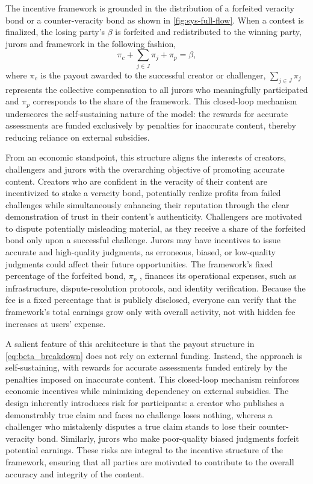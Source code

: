 \documentclass{article}
\begin{document}
The incentive framework is grounded in the distribution of a forfeited veracity bond or a counter-veracity bond as shown in \autoref{fig:sys-full-flow}. When a contest is finalized, the losing party's $\beta$ is forfeited and redistributed to the winning party, jurors and framework in the following fashion,
\begin{equation}
    \pi_c + \sum_{j \in J} \pi_j + \pi_p = \beta,
    \label{eq:beta_breakdown}
\end{equation}
where $\pi_c$ is the payout awarded to the successful creator or challenger, $\sum_{j \in J} \pi_j$ represents the collective compensation to all jurors who meaningfully participated and $\pi_p$ corresponds to the share of the framework. This closed-loop mechanism underscores the self-sustaining nature of the model: the rewards for accurate assessments are funded exclusively by penalties for inaccurate content, thereby reducing reliance on external subsidies.

From an economic standpoint, this structure aligns the interests of creators, challengers and jurors with the overarching objective of promoting accurate content. Creators who are confident in the veracity of their content are incentivized to stake a veracity bond, potentially realize profits from failed challenges while simultaneously enhancing their reputation through the clear demonstration of trust in their content’s authenticity. Challengers are motivated to dispute potentially misleading material, as they receive a share of the forfeited bond only upon a successful challenge. Jurors may have incentives to issue accurate and high-quality judgments, as erroneous, biased, or low-quality judgments could affect their future opportunities. The framework's fixed percentage of the forfeited bond, $\pi_p$ , finances its operational expenses, such as infrastructure, dispute-resolution protocols, and identity verification. Because the fee is a fixed percentage that is publicly disclosed, everyone can verify that the framework’s total earnings grow only with overall activity, not with hidden fee increases at users’ expense.

A salient feature of this architecture is that the payout structure in \cref{eq:beta_breakdown} does not rely on external funding. Instead, the approach is self-sustaining, with rewards for accurate assessments funded entirely by the penalties imposed on inaccurate content. This closed-loop mechanism reinforces economic incentives while minimizing dependency on external subsidies. The design inherently introduces risk for participants: a creator who publishes a demonstrably true claim and faces no challenge loses nothing, whereas a challenger who mistakenly disputes a true claim stands to lose their counter-veracity bond. Similarly, jurors who make poor-quality biased judgments forfeit potential earnings. These risks are integral to the incentive structure of the framework, ensuring that all parties are motivated to contribute to the overall accuracy and integrity of the content.
\end{document}

